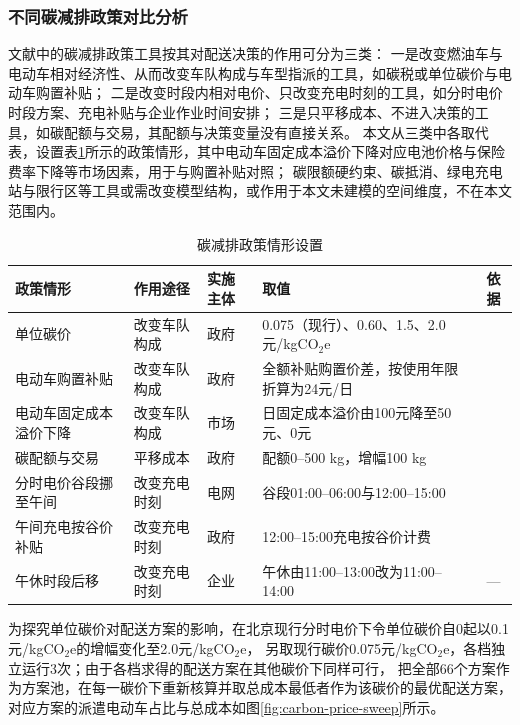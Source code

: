 \subsubsection{不同碳减排政策对比分析}

文献中的碳减排政策工具按其对配送决策的作用可分为三类：
一是改变燃油车与电动车相对经济性、从而改变车队构成与车型指派的工具，如碳税或单位碳价\cite{ref:23,ref:qiu2024}与电动车购置补贴\cite{ref:wilson2026}；
二是改变时段内相对电价、只改变充电时刻的工具，如分时电价时段方案\cite{ref:93}、充电补贴\cite{ref:wu2022}与企业作业时间安排；
三是只平移成本、不进入决策的工具，如碳配额与交易，其配额与决策变量没有直接关系\cite{ref:lijin2014,ref:23}。
本文从三类中各取代表，设置表\ref{tab:policy-scenarios}所示的政策情形，其中电动车固定成本溢价下降对应电池价格与保险费率下降等市场因素，用于与购置补贴对照；
碳限额硬约束、碳抵消、绿电充电站与限行区等工具或需改变模型结构，或作用于本文未建模的空间维度，不在本文范围内。

\begin{table}[H]
  \centering
  \caption{碳减排政策情形设置}
  \label{tab:policy-scenarios}
  \small
  \begin{tabular*}{\textwidth}{@{\extracolsep{\fill}}llllc@{}}
    \toprule
    政策情形 & 作用途径 & 实施主体 & 取值 & 依据\\
    \midrule
    单位碳价 & 改变车队构成 & 政府 & 0.075（现行）、0.60、1.5、2.0元/kgCO$_2$e & \cite{ref:23,ref:qiu2024}\\
    电动车购置补贴 & 改变车队构成 & 政府 & 全额补贴购置价差，按使用年限折算为24元/日 & \cite{ref:wilson2026}\\
    电动车固定成本溢价下降 & 改变车队构成 & 市场 & 日固定成本溢价由100元降至50元、0元 & \cite{ref:wilson2026}\\
    碳配额与交易 & 平移成本 & 政府 & 配额0--500 kg，增幅100 kg & \cite{ref:lijin2014}\\
    分时电价谷段挪至午间 & 改变充电时刻 & 电网 & 谷段01:00--06:00与12:00--15:00 & \cite{ref:hebei-tou}\\
    午间充电按谷价补贴 & 改变充电时刻 & 政府 & 12:00--15:00充电按谷价计费 & \cite{ref:wu2022}\\
    午休时段后移 & 改变充电时刻 & 企业 & 午休由11:00--13:00改为11:00--14:00 & ---\\
    \bottomrule
  \end{tabular*}
\end{table}

为探究单位碳价对配送方案的影响，在北京现行分时电价下令单位碳价自0起以0.1元/kgCO$_2$e的增幅变化至2.0元/kgCO$_2$e，
另取现行碳价0.075元/kgCO$_2$e，各档独立运行3次；由于各档求得的配送方案在其他碳价下同样可行，
把全部66个方案作为方案池，在每一碳价下重新核算并取总成本最低者作为该碳价的最优配送方案，
对应方案的派遣电动车占比与总成本如图\ref{fig:carbon-price-sweep}所示。

